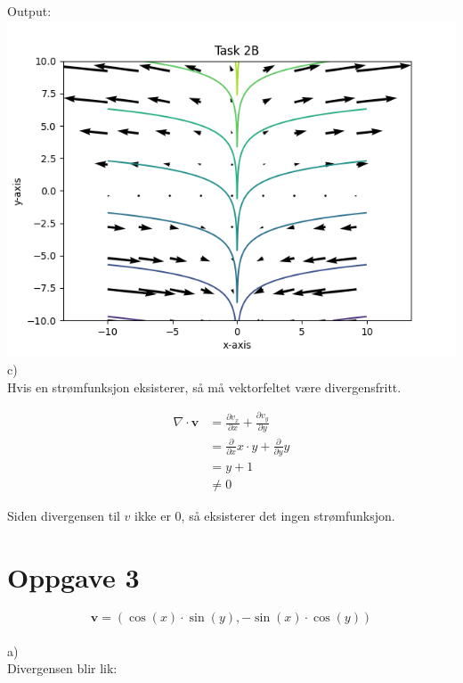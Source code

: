 \documentclass[12pt, a4paper]{article}
\begin{document}
\newpage
Output: \\
\hspace*{-1.5cm}
\includegraphics{two_b}
\\
c) \\
Hvis en strømfunksjon eksisterer, så må vektorfeltet være divergensfritt.

\begin{equation}
    \begin{split}
        \nabla \cdot \textbf{v} &= \frac{\partial v_x}{\partial x} + \frac{\partial v_y}{\partial y} \\
                                &= \frac{\partial}{\partial x} x \cdot y + \frac{\partial}{\partial y} y \\
                                &= y + 1 \\
                                &\neq 0
    \end{split}
\end{equation}

Siden divergensen til $v$ ikke er $0$, så eksisterer det ingen strømfunksjon.




\newpage
\section*{Oppgave 3}

\begin{equation}
    \textbf{v} = (\cos(x) \cdot \sin(y), -\sin(x) \cdot \cos(y))
\end{equation}
\\
a)\\
Divergensen blir lik:
\end{document}
